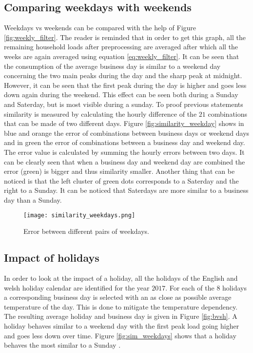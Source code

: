 \subsection{Comparing weekdays with weekends} \label{s:Comparing weekdays with weekends}
Weekdays vs weekends can be compared with the help of Figure \ref{fig:weekly_filter}. The reader is reminded that in order to get this graph, all the remaining household loads after preprocessing are averaged after which all the weeks are again averaged using equation \ref{eq:weekly_filter}. It can be seen that the consumption of the average business day is similar to a weekend day concerning the two main peaks during the day and the sharp peak at midnight. However, it can be seen that the first peak during the day is higher and goes less down again during the weekend. This effect can be seen both during a Sunday and Saterday, but is most visible during a sunday. To proof previous statements similarity is measured by calculating the hourly difference of the $ 21 $ combinations that can be made of two different days. Figure \ref{fig:similarity_weekday} shows in blue and orange the error of combinations between business days or weekend days and in green the error of combinations between a business day and weekend day. The error value is calculated by summing the hourly errors between two days. It can be clearly seen that when a business day and weekend day are combined the error (green) is bigger and thus similarity smaller. Another thing that can be noticed is that the left cluster of green dots corresponds to a Saterday and the right to a Sunday. It can be noticed that Saterdays are more similar to a business day than a Sunday. 

\begin{figure}[h!]
	\centering
	\texttt{[image: similarity\_weekdays.png]}
	\caption{Error between different pairs of weekdays.}
	\label{fig:similarity_weekdays}
\end{figure}




\subsection{Impact of holidays}
In order to look at the impact of a holiday, all the holidays of the English and welsh holiday calendar are identified for the year $ 2017 $. For each of the $ 8 $ holidays a corresponding business day is selected with an as close as possible average temperature of the day. This is done to mitigate the temperature dependency. The resulting average holiday and business day is given in Figure \ref{fig:bvsh}. A holiday behaves similar to a weekend day with the first peak load going higher and goes less down over time. Figure \ref{fig:sim_weekdays} shows that a holiday behaves the most similar to a Sunday .

